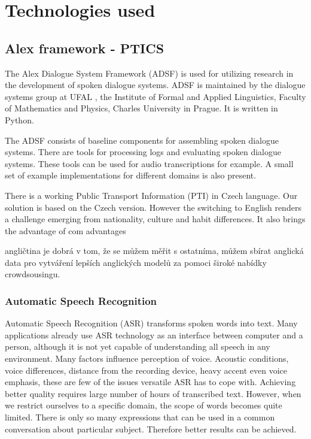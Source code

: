 \chapter{Technologies used}

\section{Alex framework - PTICS}

The Alex Dialogue System Framework (ADSF) is used for utilizing research in the development of spoken dialogue systems.
ADSF is maintained by the dialogue systems group at UFAL \cite{ufal}, the Institute of Formal and Applied Linguistics, Faculty of Mathematics and Physics, Charles University in Prague.
It is written in Python.

The ADSF consists of baseline components for assembling spoken dialogue systems.
There are tools for processing logs and evaluating spoken dialogue systems.
These tools can be used for audio transcriptions for example.
A small set of example implementations for different domains is also present.

There is a working Public Transport Information (PTI) \cite{ptics} in Czech language.
Our solution is based on the Czech version.
However the switching to English renders a challenge emerging from nationality, culture and habit differences.
It also brings the advantage of com advantages 

angličtina je dobrá v tom, že se můžem měřit s ostatníma, můžem sbírat anglická data pro vytváření lepších anglických modelů za pomoci široké nabídky crowdsousingu. 


\subsection{Automatic Speech Recognition}

Automatic Speech Recognition (ASR) transforms spoken words into text.
Many applications already use ASR technology as an interface between computer and a person, although it is not yet capable of understanding all speech in any environment.
Many factors influence perception of voice.
Acoustic conditions, voice differences, distance from the recording device, heavy accent even voice emphasis, these are few of the issues versatile ASR has to cope with.
Achieving better quality requires large number of hours of transcribed text.
However, when we restrict ourselves to a specific domain, the scope of words becomes quite limited.
There is only so many expressions that can be used in a common conversation about particular subject.
Therefore better results can be achieved.

